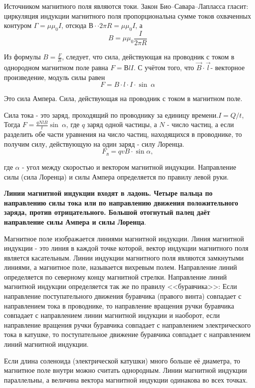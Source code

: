 \documentclass[a5paper, 10pt]{diss_4}
\renewcommand{\'}{\,'}
\begin{document}
Источником магнитного поля являются токи. Закон Био--Савара--Лапласса гласит: циркуляция индукции магнитного поля пропорциональна сумме токов охваченных контуром $\Gamma=\mu\mu_0I$, отсюда $В·\cdot2\pi R=\mu\mu_0I$, а
\[
B=\mu\mu_0\frac{I}{2\pi R}
\]

Из формулы $B=\frac{F}{Il}$, следует, что сила, действующая на проводник с током в однородном магнитном поле равна $F=ВlI$. С учётом  того, что $\vec{B}\cdot\vec{l}$- векторное произведение,  модуль силы равен
\[
F=B\cdot l\cdot I\cdot\sin\ \alpha
\]

Это сила Ампера. Сила, действующая на проводник с током в магнитном поле.

Сила тока - это заряд, проходящий по проводнику за единицу времени.$I=Q/t$,
Тогда $F=\frac{qNlB}{t}\sin\ \alpha$, где $q$ заряд одной частицы, а $N$ - число частиц, а если разделить обе части уравнения  на число частиц, находящихся в проводнике, то получим силу, действующую на один заряд - силу Лоренца.
\[
F_л=qvB\cdot\sin \alpha,
\]

где $\alpha$ - угол между скоростью и вектором магнитной индукции. Направление силы (сила Лоренца) и силы Ампера определяется по правилу левой руки.

\textbf{Линии магнитной индукции входят в ладонь. Четыре пальца по направлению силы тока или по направлению движения положительного заряда, против отрицательного. Большой отогнутый палец даёт направление силы Ампера и силы Лоренца}.

Магнитное поле изображается линиями магнитной индукции. Линия  магнитной индукции - это линия в каждой точке которой, вектор индукции магнитного поля является касательным.  Линии индукции магнитного поля являются замкнутыми линиями, а магнитное поле, называется вихревым полем. Направление линий определяется по северному концу магнитной стрелки.
Направление линий магнитной индукции определяется так же по правилу <<буравчика>>: Если направление поступательного движения буравчика (правого винта) совпадает с направлением тока в проводнике, то направление вращения ручки буравчика совпадает с направлением линии магнитной индукции и наоборот, если направление вращения ручки буравчика совпадает с направлением электрического тока в катушке, то поступательное движение буравчика совпадает с направлением линий магнитной индукции.

Если длина соленоида (электрической катушки) много больше её диаметра, то магнитное поле внутри можно считать однородным. Линии магнитной индукции параллельны, а величина вектора магнитной индукции одинакова во всех точках.
\end{document}
